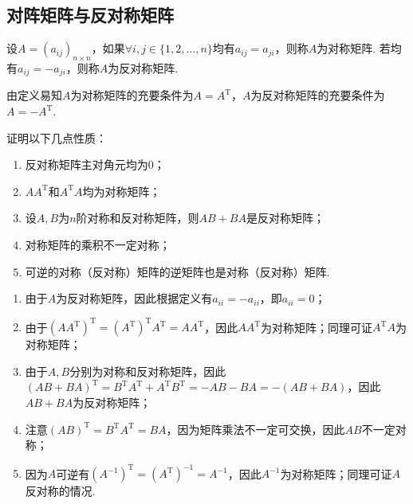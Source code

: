 \subsection{对阵矩阵与反对称矩阵}

\begin{definition}{}{}
    设$A=(a_{ij})_{n \times n}$，如果$\forall i,j\in\{1,2,\ldots,n\}$均有$a_{ij}=a_{ji}$，则称$A$为对称矩阵. 若均有$a_{ij}=-a_{ji}$，则称$A$为反对称矩阵.
\end{definition}
由定义易知$A$为对称矩阵的充要条件为$A=A^\mathrm{T}$，$A$为反对称矩阵的充要条件为$A=-A^\mathrm{T}$.
\begin{example}{}{}
    证明以下几点性质：
    \begin{enumerate}
        \item 反对称矩阵主对角元均为0；

        \item $AA^\mathrm{T}$和$A^\mathrm{T}A$均为对称矩阵；

        \item 设$A,B$为$n$阶对称和反对称矩阵，则$AB+BA$是反对称矩阵；

        \item 对称矩阵的乘积不一定对称；

        \item 可逆的对称（反对称）矩阵的逆矩阵也是对称（反对称）矩阵.
    \end{enumerate}
\end{example}

\begin{solution}
    \begin{enumerate}
        \item 由于$A$为反对称矩阵，因此根据定义有$a_{ii}=-a_{ii}$，即$a_{ii}=0$；

        \item 由于$(AA^\mathrm{T})^\mathrm{T}=(A^\mathrm{T})^\mathrm{T}A^\mathrm{T}=AA^\mathrm{T}$，因此$AA^\mathrm{T}$为对称矩阵；同理可证$A^\mathrm{T}A$为对称矩阵；

        \item 由于$A,B$分别为对称和反对称矩阵，因此$(AB+BA)^\mathrm{T}=B^\mathrm{T}A^\mathrm{T}+A^\mathrm{T}B^\mathrm{T}=-AB-BA=-(AB+BA)$，因此$AB+BA$为反对称矩阵；

        \item 注意$(AB)^\mathrm{T}=B^\mathrm{T}A^\mathrm{T}=BA$，因为矩阵乘法不一定可交换，因此$AB$不一定对称；

        \item 因为$A$可逆有$(A^{-1})^\mathrm{T}=(A^\mathrm{T})^{-1}=A^{-1}$，因此$A^{-1}$为对称矩阵；同理可证$A$反对称的情况.
    \end{enumerate}
\end{solution}

